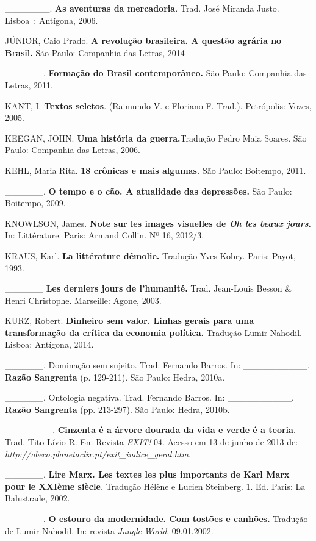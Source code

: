 \_\_\_\_\_\_\_. \textbf{As aventuras da mercadoria}\emph{.} Trad. José
Miranda Justo. Lisboa~: Antígona, 2006.

JÚNIOR, Caio Prado. \textbf{A revolução brasileira. A questão agrária no
Brasil.} São Paulo: Companhia das Letras, 2014

\_\_\_\_\_\_. \textbf{Formação do Brasil contemporâneo.} São Paulo:
Companhia das Letras, 2011.

KANT, I. \textbf{Textos seletos}. (Raimundo V. e Floriano F. Trad.).
Petrópolis: Vozes, 2005.

KEEGAN, JOHN. \textbf{Uma história da guerra.}Tradução Pedro Maia
Soares. São Paulo: Companhia das Letras, 2006.

KEHL, Maria Rita. \textbf{18 crônicas e mais algumas.} São Paulo:
Boitempo, 2011.

\_\_\_\_\_\_. \textbf{O tempo e o cão. A atualidade das depressões.} São
Paulo: Boitempo, 2009.

KNOWLSON, James. \textbf{Note sur les images visuelles de \emph{Oh les
beaux jours}.} In: Littérature. Paris: Armand Collin. Nº 16, 2012/3.

KRAUS, Karl. \textbf{La littérature démolie.} Tradução Yves Kobry.
Paris: Payot, 1993.

\_\_\_\_\_\_ \textbf{Les derniers jours de l'humanité.} Trad. Jean-Louis
Besson \& Henri Christophe. Marseille: Agone, 2003.

KURZ, Robert. \textbf{Dinheiro sem valor. Linhas gerais para uma
transformação da crítica da economia política.} Tradução Lumir Nahodil.
Lisboa: Antígona, 2014.

\_\_\_\_\_\_. Dominação sem sujeito. Trad. Fernando Barros. In:
\_\_\_\_\_\_\_\_\_\_. \textbf{Razão Sangrenta} (p. 129-211). São Paulo:
Hedra, 2010a.

\_\_\_\_\_\_. Ontologia negativa. Trad. Fernando Barros. In:
\_\_\_\_\_\_\_\_\_\_. \textbf{Razão Sangrenta} (pp. 213-297). São Paulo:
Hedra, 2010b.

\_\_\_\_\_\_\_ . \textbf{Cinzenta é a árvore dourada da vida e verde é a
teoria}. Trad. Tito Lívio R. Em Revista \emph{EXIT!} 04. Acesso em 13 de
junho de 2013 de:
\emph{http://obeco.planetaclix.pt/exit\_indice\_geral.htm}.

\_\_\_\_\_\_. \textbf{Lire Marx. Les textes les plus importants de Karl
Marx pour le XXIème siècle}\emph{.} Tradução Hélène e Lucien Steinberg.
1. Ed. Paris: La Balustrade, 2002.

\_\_\_\_\_\_. \textbf{O estouro da modernidade. Com tostões e canhões.}
Tradução de Lumir Nahodil. In: revista \emph{Jungle} \emph{World},
09.01.2002.


